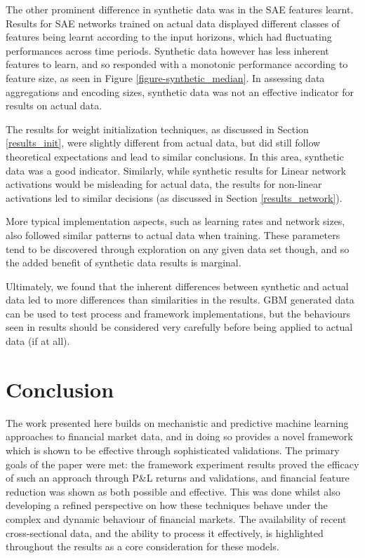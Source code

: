 \documentclass[a4paper,11pt,oneside]{article}
\theoremstyle{plain}
\theoremstyle{definition}
\begin{document}
	The other prominent difference in synthetic data was in the SAE features learnt. Results for SAE networks trained on actual data displayed different classes of features being learnt according to the input horizons, which had fluctuating performances across time periods. Synthetic data however has less inherent features to learn, and so responded with a monotonic performance according to feature size, as seen in Figure \ref{figure-synthetic_median}. In assessing data aggregations and encoding sizes, synthetic data was not an effective indicator for results on actual data. \newline

	The results for weight initialization techniques, as discussed in Section \ref{results_init}, were slightly different from actual data, but did still follow theoretical expectations and lead to similar conclusions. In this area, synthetic data was a good indicator. Similarly, while synthetic results for Linear network activations would be misleading for actual data, the results for non-linear activations led to similar decisions (as discussed in Section \ref{results_network}).\newline
	
	More typical implementation aspects, such as learning rates and network sizes, also followed similar patterns to actual data when training. These parameters tend to be discovered through exploration on any given data set though, and so the added benefit of synthetic data results is marginal.\newline
	
	Ultimately, we found that the inherent differences between synthetic and actual data led to more differences than similarities in the results. GBM generated data can be used to test process and framework implementations, but the behaviours seen in results should be considered very carefully before being applied to actual data (if at all).
	
	
	
	
	
	\newpage
	\section{Conclusion}\label{Conclusion}
	
	The work presented here builds on mechanistic and predictive machine learning approaches to financial market data, and in doing so provides a novel framework which is shown to be effective through sophisticated validations. The primary goals of the paper were met: the framework experiment results proved the efficacy of such an approach through P\&L returns and validations, and financial feature reduction was shown as both possible and effective. This was done whilst also developing a refined perspective on how these techniques behave under the complex and dynamic behaviour of financial markets. The availability of recent cross-sectional data, and the ability to process it effectively, is highlighted throughout the results as a core consideration for these models. \newline
	
\end{document}
